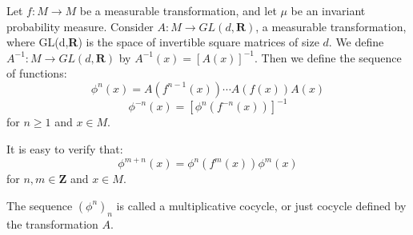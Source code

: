 \documentclass[12pt]{article}
\begin{document}
Let $f:M\rightarrow M$ be a measurable transformation, and let $\mu$ be an invariant probability measure. Consider $A:M\rightarrow GL(d,\textbf{R})$, a measurable transformation, where GL(d,\textbf{R}) is the space of invertible square matrices of size $d$. We define $A^{-1}:M\rightarrow GL(d,\textbf{R})$ by $A^{-1}(x)=[A(x)]^{-1}$.
Then we define the sequence of functions:
$$\phi^n (x)=A(f^{n-1}(x)) \cdots A(f(x))A(x)$$
$$\phi^{-n}(x)=[\phi^n(f^{-n}(x))]^{-1}$$
for $n\geq 1$ and $x \in M$.

It is easy to verify that:
$$\phi^{m+n}(x)=\phi^n(f^m(x))\phi^m(x)$$
for $n,m\in \textbf{Z}$ and $x \in M$.

The sequence $(\phi^n)_n$ is called a multiplicative cocycle, or just cocycle defined by the transformation $A$.
\end{document}
